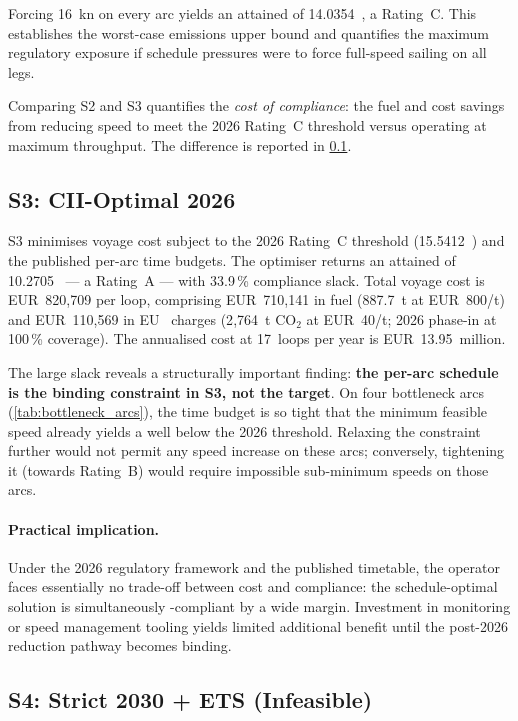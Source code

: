Forcing 16~kn on every arc yields an attained \CII{} of 14.0354~\gGTnm{},
a Rating~C.  This establishes the worst-case emissions upper bound and
quantifies the maximum regulatory exposure if schedule pressures were to
force full-speed sailing on all legs.

Comparing S2 and S3 quantifies the \emph{cost of \CII{} compliance}: the
fuel and cost savings from reducing speed to meet the 2026 Rating~C
threshold versus operating at maximum throughput.  The difference is
reported in \cref{sec:res:s3}.

\subsection{S3: CII-Optimal 2026}
\label{sec:res:s3}

S3 minimises voyage cost subject to the 2026 Rating~C \CII{} threshold
(15.5412~\gGTnm{}) and the published per-arc time budgets.  The optimiser
returns an attained \CII{} of 10.2705~\gGTnm{} --- a Rating~A --- with
33.9\,\% compliance slack.  Total voyage cost is EUR~820{,}709 per loop,
comprising EUR~710{,}141 in fuel (887.7~t at EUR~800/t) and
EUR~110{,}569 in EU~\ETS{} charges (2{,}764~t CO$_2$ at EUR~40/t;
2026 \ETS{} phase-in at 100\,\% coverage).
The annualised cost at 17~loops per year is EUR~13.95~million.

The large slack reveals a structurally important finding: \textbf{the
per-arc schedule is the binding constraint in S3, not the \CII{} target}.
On four bottleneck arcs (\cref{tab:bottleneck_arcs}), the time budget is so
tight that the minimum feasible speed already yields a \CII{} well below the
2026 threshold.  Relaxing the \CII{} constraint further would not permit any
speed increase on these arcs; conversely, tightening it (towards Rating~B)
would require impossible sub-minimum speeds on those arcs.

\paragraph{Practical implication.}
Under the 2026 regulatory framework and the published timetable, the operator
faces essentially no trade-off between cost and \CII{} compliance: the
schedule-optimal solution is simultaneously \CII{}-compliant by a wide
margin.  Investment in \CII{} monitoring or speed management tooling yields
limited additional benefit until the post-2026 reduction pathway becomes
binding.

\subsection{S4: Strict 2030 + ETS (Infeasible)}
\label{sec:res:s4}

